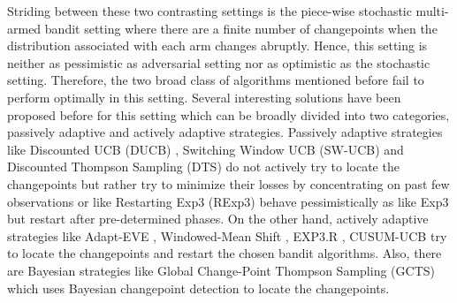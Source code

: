 Striding between these two contrasting settings is the piece-wise stochastic multi-armed bandit setting where there are a finite number of changepoints when the distribution associated with each arm changes abruptly. Hence, this setting is neither as pessimistic as adversarial setting nor as optimistic as the stochastic setting. Therefore, the two broad class of algorithms mentioned before fail to perform optimally in this setting. Several interesting solutions have been proposed before for this setting which can be broadly divided into two categories, passively adaptive and actively adaptive strategies. Passively adaptive strategies like Discounted UCB (DUCB) \citep{kocsis2006discounted}, Switching Window UCB (SW-UCB)  \citep{garivier2011upper} and Discounted Thompson Sampling (DTS) \citep{raj2017taming} do not actively try to locate the changepoints but rather try to minimize their losses by concentrating on past few observations or like Restarting Exp3 (RExp3) \citep{DBLP:journals/corr/BesbesGZ14} behave pessimistically as like Exp3 but restart after pre-determined phases. On the other hand, actively adaptive strategies like Adapt-EVE \citep{hartland2007change}, Windowed-Mean Shift \citep{yu2009piecewise}, EXP3.R \citep{allesiardo2017non}, CUSUM-UCB \citep{liu2017change} try to locate the changepoints and restart the chosen bandit algorithms. Also, there are Bayesian strategies like Global Change-Point Thompson Sampling (GCTS)\citep{mellor2013thompson} which uses Bayesian changepoint detection to locate the changepoints. 